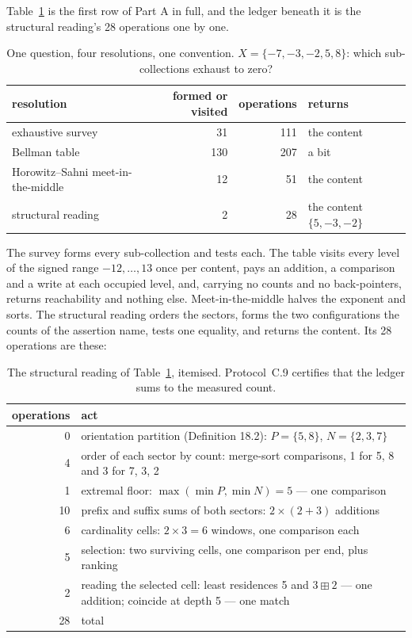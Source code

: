 \documentclass[pdflatex,sn-mathphys-num]{sn-jnl}
\theoremstyle{thmstyleone}%
\theoremstyle{thmstyletwo}%
\theoremstyle{thmstylethree}%
\newcommand{\workedStructOps}{28}
\begin{document}
Table~\ref{tab:worked} is the first row of Part A in full, and the ledger beneath it is the structural reading's \workedStructOps{} operations one by one.

\begin{table}[!htbp]
\centering
\caption{One question, four resolutions, one convention. $X=\{-7,-3,-2,5,8\}$: which sub-collections exhaust to zero?}
\label{tab:worked}
\begin{tabular}{lrrl}
\toprule
resolution & formed or visited & operations & returns \\
\midrule
exhaustive survey & 31 & 111 & the content \\
Bellman table & 130 & 207 & a bit \\
Horowitz--Sahni meet-in-the-middle & 12 & 51 & the content \\
structural reading & 2 & 28 & the content $\{5,-3,-2\}$ \\
\bottomrule
\end{tabular}
\end{table}

The survey \citep{GareyJohnson1979} forms every sub-collection and tests each. The table \citep{Bellman1957} visits every level of the signed range $-12,\dots,13$ once per content, pays an addition, a comparison and a write at each occupied level, and, carrying no counts and no back-pointers, returns reachability and nothing else. Meet-in-the-middle \citep{HorowitzSahni1974} halves the exponent and sorts. The structural reading orders the sectors, forms the two configurations the counts of the assertion name, tests one equality, and returns the content. Its \workedStructOps{} operations are these:

\begin{table}[!htbp]
\centering
\caption{The structural reading of Table~\ref{tab:worked}, itemised. Protocol~C.9 certifies that the ledger sums to the measured count.}
\label{tab:ledger}
\begin{tabular}{r@{\hspace{1em}}p{}}
\toprule
operations & act \\
\midrule
0 & orientation partition (Definition 18.2): $P=\{5,8\}$, $N=\{2,3,7\}$ \\
4 & order of each sector by count: merge-sort comparisons, 1 for {5, 8} and 3 for {7, 3, 2} \\
1 & extremal floor: $\max(\min P,\min N)=5$ --- one comparison \\
10 & prefix and suffix sums of both sectors: $2\times(2+3)$ additions \\
6 & cardinality cells: $2\times 3=6$ windows, one comparison each \\
5 & selection: two surviving cells, one comparison per end, plus ranking \\
2 & reading the selected cell: least residences 5 and $3\boxplus 2$ --- one addition; coincide at depth 5 --- one match \\
\midrule
28 & total \\
\bottomrule
\end{tabular}
\end{table}
\end{document}
